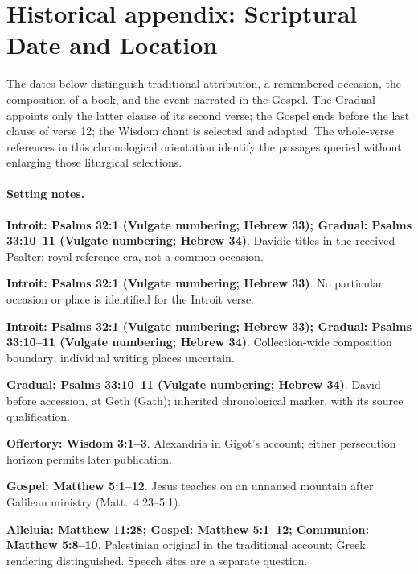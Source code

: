 \section{Historical appendix: Scriptural Date and Location}
\label{historical-appendix}

The dates below distinguish traditional attribution, a remembered occasion,
the composition of a book, and the event narrated in the Gospel. The
Gradual appoints only the latter clause of its second verse; the Gospel
ends before the last clause of verse 12; the Wisdom chant is selected and
adapted. The whole-verse references in this chronological orientation
identify the passages queried without enlarging those liturgical selections.



\paragraph{Setting notes.}
\noindent\textbf{Introit: Psalms 32:1 (Vulgate numbering; Hebrew 33); Gradual: Psalms 33:10--11 (Vulgate numbering; Hebrew 34)}. Davidic titles in the received Psalter; royal reference era, not a common occasion.

\noindent\textbf{Introit: Psalms 32:1 (Vulgate numbering; Hebrew 33)}. No particular occasion or place is identified for the Introit verse.

\noindent\textbf{Introit: Psalms 32:1 (Vulgate numbering; Hebrew 33); Gradual: Psalms 33:10--11 (Vulgate numbering; Hebrew 34)}. Collection-wide composition boundary; individual writing places uncertain.

\noindent\textbf{Gradual: Psalms 33:10--11 (Vulgate numbering; Hebrew 34)}. David before accession, at Geth (Gath); inherited chronological marker, with its source qualification.

\noindent\textbf{Offertory: Wisdom 3:1--3}. Alexandria in Gigot's account; either persecution horizon permits later publication.

\noindent\textbf{Gospel: Matthew 5:1--12}. Jesus teaches on an unnamed mountain after Galilean ministry (Matt.~4:23--5:1).

\noindent\textbf{Alleluia: Matthew 11:28; Gospel: Matthew 5:1--12; Communion: Matthew 5:8--10}. Palestinian original in the traditional account; Greek rendering distinguished. Speech sites are a separate question.

